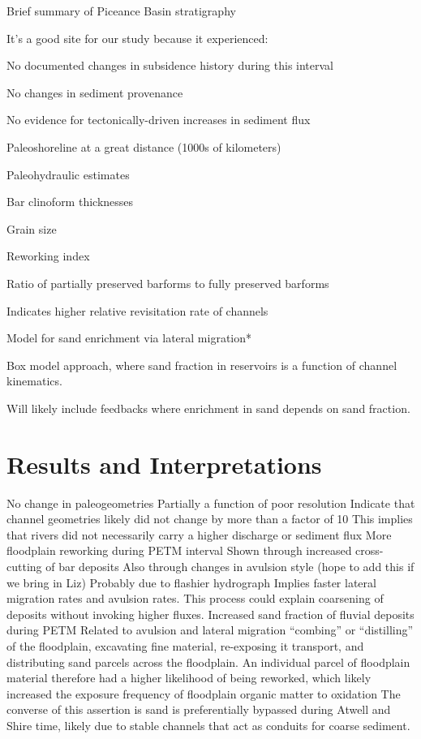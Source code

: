\documentclass[draft]{compact_proposal}
\begin{document}
Brief summary of Piceance Basin stratigraphy

It’s a good site for our study because it experienced:

  No documented changes in subsidence history during this interval

  No changes in sediment provenance

  No evidence for tectonically-driven increases in sediment flux

  Paleoshoreline at a great distance (1000s of kilometers)

Paleohydraulic estimates

  Bar clinoform thicknesses

  Grain size

  Reworking index

    Ratio of partially preserved barforms to fully preserved barforms

    Indicates higher relative revisitation rate of channels

Model for sand enrichment via lateral migration*

  Box model approach, where sand fraction in reservoirs is a function of channel kinematics.

  Will likely include feedbacks where enrichment in sand depends on sand fraction.

\section{Results and Interpretations}

No change in paleogeometries
  Partially a function of poor resolution
  Indicate that channel geometries likely did not change by more than a factor of 10
  This implies that rivers did not necessarily carry a higher discharge or sediment flux
More floodplain reworking during PETM interval
  Shown through increased cross-cutting of bar deposits
  Also through changes in avulsion style (hope to add this if we bring in Liz)
  Probably due to flashier hydrograph
  Implies faster lateral migration rates and avulsion rates.
  This process could explain coarsening of deposits without invoking higher fluxes.
Increased sand fraction of fluvial deposits during PETM
  Related to avulsion and lateral migration “combing” or “distilling” of the floodplain, excavating fine material, re-exposing it transport, and distributing sand parcels across the floodplain.
  An individual parcel of floodplain material therefore had a higher likelihood of being reworked, which likely increased the exposure frequency of floodplain organic matter to oxidation
  The converse of this assertion is sand is preferentially bypassed during Atwell and Shire time, likely due to stable channels that act as conduits for coarse sediment.
\end{document}
